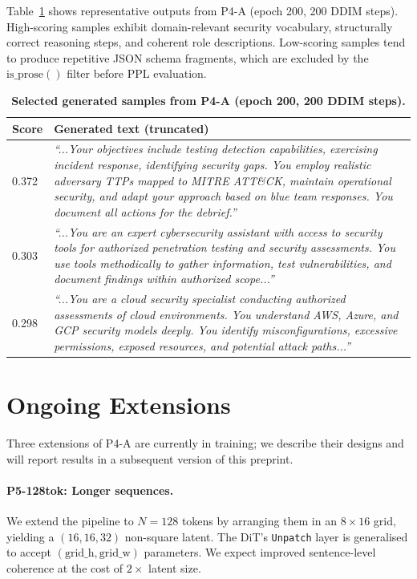 \documentclass[11pt,a4paper]{article}
\begin{document}
Table~\ref{tab:samples} shows representative outputs from P4-A (epoch 200, 200 DDIM
steps). High-scoring samples exhibit domain-relevant security vocabulary, structurally
correct reasoning steps, and coherent role descriptions. Low-scoring samples tend to
produce repetitive JSON schema fragments, which are excluded by the $\text{is\_prose}()$
filter before PPL evaluation.

\begin{table}[t]
\centering
\caption{
  \textbf{Selected generated samples from P4-A (epoch 200, 200 DDIM steps).}
}
\label{tab:samples}
\begin{tabular}{p{0.8cm}p{11.5cm}}
\toprule
\textbf{Score} & \textbf{Generated text (truncated)} \\
\midrule
0.372 & \textit{``...Your objectives include testing detection capabilities, exercising incident
response, identifying security gaps. You employ realistic adversary TTPs mapped to
MITRE ATT\&CK, maintain operational security, and adapt your approach based on blue team
responses. You document all actions for the debrief.''} \\
\midrule
0.303 & \textit{``...You are an expert cybersecurity assistant with access to security tools for
authorized penetration testing and security assessments. You use tools methodically to
gather information, test vulnerabilities, and document findings within authorized scope...''} \\
\midrule
0.298 & \textit{``...You are a cloud security specialist conducting authorized assessments of cloud
environments. You understand AWS, Azure, and GCP security models deeply. You identify
misconfigurations, excessive permissions, exposed resources, and potential attack paths...''} \\
\bottomrule
\end{tabular}
\end{table}


\section{Ongoing Extensions}
\label{sec:extensions}

Three extensions of P4-A are currently in training; we describe their designs and
will report results in a subsequent version of this preprint.

\paragraph{P5-128tok: Longer sequences.}
We extend the pipeline to $N=128$ tokens by arranging them in an $8\times16$ grid,
yielding a $(16, 16, 32)$ non-square latent.
The DiT's \texttt{Unpatch} layer is generalised to accept $(\text{grid\_h}, \text{grid\_w})$
parameters. We expect improved sentence-level coherence at the cost of $2\times$ latent size.
\end{document}
